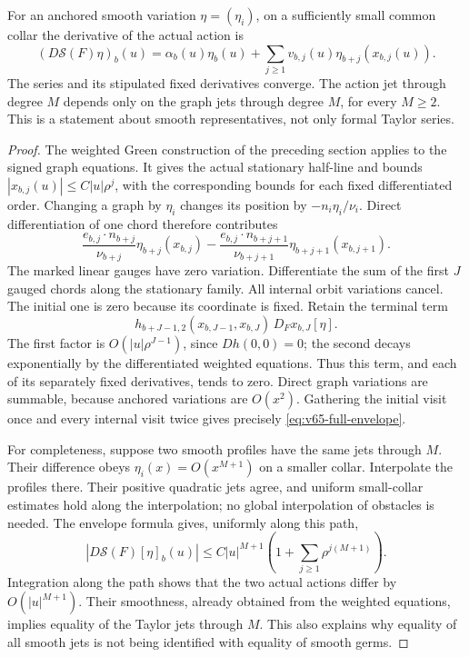 \begin{lemma}\label{lem:v65-envelope}
For an anchored smooth variation $\eta=(\eta_i)$, on a sufficiently
small common collar the derivative of the actual action is
\begin{equation}\label{eq:v65-full-envelope}
 (D\mathcal S(F)\eta)_b(u)
   =\alpha_b(u)\eta_b(u)
        +\sum_{j\ge1}v_{b,j}(u)\eta_{b+j}(x_{b,j}(u)).
\end{equation}
The series and its stipulated fixed derivatives converge.  The action
jet through degree $M$ depends only on the graph jets through degree
$M$, for every $M\ge2$.  This is a statement about smooth representatives,
not only formal Taylor series.
\end{lemma}
\begin{proof}
The weighted Green construction of the preceding section applies to the
signed graph equations.  It gives the actual stationary half-line and
bounds $|x_{b,j}(u)|\le C|u|\rho^j$, with the corresponding bounds
for each fixed differentiated order.  Changing a graph by $\eta_i$
changes its position by $-n_i\eta_i/\nu_i$.  Direct differentiation
of one chord therefore contributes
\[
 \frac{e_{b,j}\cdot n_{b+j}}{\nu_{b+j}}
                  \eta_{b+j}(x_{b,j})
 -\frac{e_{b,j}\cdot n_{b+j+1}}{\nu_{b+j+1}}
                  \eta_{b+j+1}(x_{b,j+1}).
\]
The marked linear gauges have zero variation.  Differentiate the sum of
the first $J$ gauged chords along the stationary family.  All internal
orbit variations cancel.  The initial one is zero because its coordinate
is fixed.  Retain the terminal term
\[
 h_{b+J-1,2}(x_{b,J-1},x_{b,J})\,D_Fx_{b,J}[\eta].
\]
The first factor is $O(|u|\rho^{J-1})$, since $Dh(0,0)=0$;
the second decays exponentially by the differentiated weighted equations.
Thus this term, and each of its separately fixed derivatives, tends to
zero.  Direct graph variations are summable, because anchored variations
are $O(x^2)$.  Gathering the initial visit once and every internal visit
twice gives precisely \eqref{eq:v65-full-envelope}.

For completeness, suppose two smooth profiles have the same jets through
$M$.  Their difference obeys $\eta_i(x)=O(x^{M+1})$ on a smaller
collar.  Interpolate the profiles there.  Their positive quadratic jets
agree, and uniform small-collar estimates hold along the interpolation;
no global interpolation of obstacles is needed.  The envelope formula
gives, uniformly along this path,
\[
 |D\mathcal S(F)[\eta]_b(u)|
  \le C|u|^{M+1}\left(1+\sum_{j\ge1}\rho^{j(M+1)}\right).
\]
Integration along the path shows that the two actual actions differ by
$O(|u|^{M+1})$.  Their smoothness, already obtained from the weighted
equations, implies equality of the Taylor jets through $M$.
This also explains why equality of all smooth jets is not being identified
with equality of smooth germs.
\end{proof}

